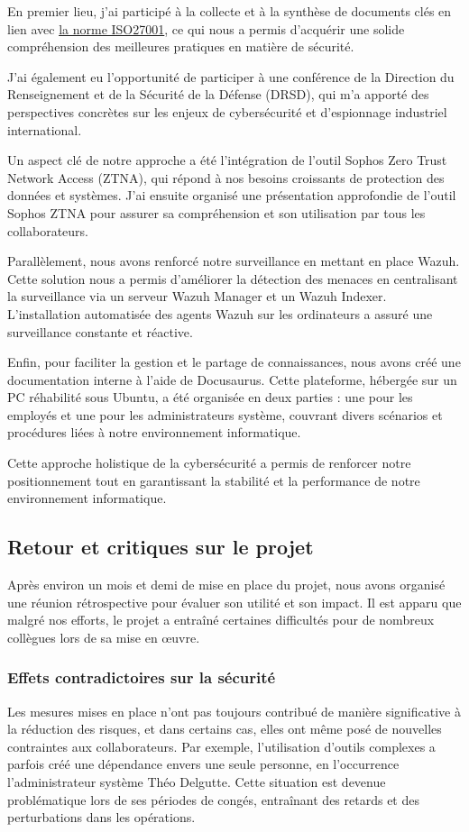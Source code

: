 En premier lieu, j'ai participé à la collecte et à la synthèse de documents clés en lien avec \hyperref[iso]{la norme ISO27001}, ce qui nous a permis d'acquérir une solide compréhension des meilleures pratiques en matière de sécurité.

J'ai également eu l'opportunité de participer à une conférence de la Direction du Renseignement et de la Sécurité de la Défense (DRSD), qui m'a apporté des perspectives concrètes sur les enjeux de cybersécurité et d'espionnage industriel international.

Un aspect clé de notre approche a été l'intégration de l'outil Sophos Zero Trust Network Access (ZTNA), qui répond à nos besoins croissants de protection des données et systèmes.
J'ai ensuite organisé une présentation approfondie de l'outil Sophos ZTNA pour assurer sa compréhension et son utilisation par tous les collaborateurs.

Parallèlement, nous avons renforcé notre surveillance en mettant en place Wazuh.
Cette solution nous a permis d'améliorer la détection des menaces en centralisant la surveillance via un serveur Wazuh Manager et un Wazuh Indexer.
L'installation automatisée des agents Wazuh sur les ordinateurs a assuré une surveillance constante et réactive.

Enfin, pour faciliter la gestion et le partage de connaissances, nous avons créé une documentation interne à l'aide de Docusaurus.
Cette plateforme, hébergée sur un PC réhabilité sous Ubuntu, a été organisée en deux parties : une pour les employés et une pour les administrateurs système, couvrant divers scénarios et procédures liées à notre environnement informatique.

Cette approche holistique de la cybersécurité a permis de renforcer notre positionnement tout en garantissant la stabilité et la performance de notre environnement informatique.

\subsection{Retour et critiques sur le projet}
Après environ un mois et demi de mise en place du projet, nous avons organisé une réunion rétrospective pour évaluer son utilité et son impact.
Il est apparu que malgré nos efforts, le projet a entraîné certaines difficultés pour de nombreux collègues lors de sa mise en œuvre.

\subsubsection{Effets contradictoires sur la sécurité}
Les mesures mises en place n'ont pas toujours contribué de manière significative à la réduction des risques, et dans certains cas, elles ont même posé de nouvelles contraintes aux collaborateurs.
Par exemple, l'utilisation d'outils complexes a parfois créé une dépendance envers une seule personne, en l'occurrence l'administrateur système Théo Delgutte.
Cette situation est devenue problématique lors de ses périodes de congés, entraînant des retards et des perturbations dans les opérations.

